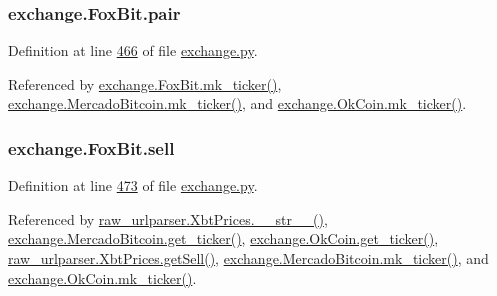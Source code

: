 \subsubsection[{\texorpdfstring{pair}{pair}}]{\setlength{\rightskip}{0pt plus 5cm}exchange.\+Fox\+Bit.\+pair}\hypertarget{classexchange_1_1_fox_bit_abfd6daf1cbad94eb74bba4c97fe4a574}{}\label{classexchange_1_1_fox_bit_abfd6daf1cbad94eb74bba4c97fe4a574}


Definition at line \hyperlink{exchange_8py_source_l00466}{466} of file \hyperlink{exchange_8py_source}{exchange.\+py}.



Referenced by \hyperlink{exchange_8py_source_l00482}{exchange.\+Fox\+Bit.\+mk\+\_\+ticker()}, \hyperlink{exchange_8py_source_l00557}{exchange.\+Mercado\+Bitcoin.\+mk\+\_\+ticker()}, and \hyperlink{exchange_8py_source_l00622}{exchange.\+Ok\+Coin.\+mk\+\_\+ticker()}.

\subsubsection[{\texorpdfstring{sell}{sell}}]{\setlength{\rightskip}{0pt plus 5cm}exchange.\+Fox\+Bit.\+sell}\hypertarget{classexchange_1_1_fox_bit_ac1fae4ef7a43254b71d7173a5cc6eeaf}{}\label{classexchange_1_1_fox_bit_ac1fae4ef7a43254b71d7173a5cc6eeaf}


Definition at line \hyperlink{exchange_8py_source_l00473}{473} of file \hyperlink{exchange_8py_source}{exchange.\+py}.



Referenced by \hyperlink{raw__urlparser_8py_source_l00074}{raw\+\_\+urlparser.\+Xbt\+Prices.\+\_\+\+\_\+str\+\_\+\+\_\+()}, \hyperlink{exchange_8py_source_l00543}{exchange.\+Mercado\+Bitcoin.\+get\+\_\+ticker()}, \hyperlink{exchange_8py_source_l00608}{exchange.\+Ok\+Coin.\+get\+\_\+ticker()}, \hyperlink{raw__urlparser_8py_source_l00065}{raw\+\_\+urlparser.\+Xbt\+Prices.\+get\+Sell()}, \hyperlink{exchange_8py_source_l00557}{exchange.\+Mercado\+Bitcoin.\+mk\+\_\+ticker()}, and \hyperlink{exchange_8py_source_l00622}{exchange.\+Ok\+Coin.\+mk\+\_\+ticker()}.

